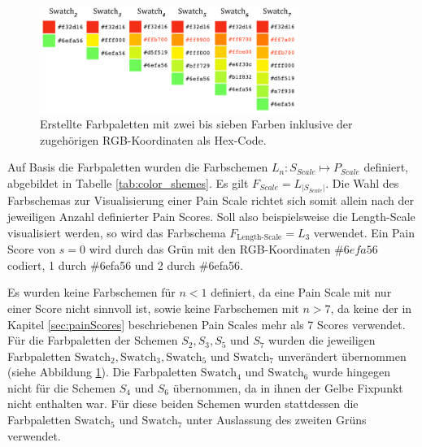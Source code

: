 \begin{figure}[h]
	\centering
	\includegraphics[width=0.75\textwidth]{bilder/colorpics.png}
	\caption{Erstellte Farbpaletten mit zwei bis sieben Farben inklusive der zugehörigen RGB-Koordinaten als Hex-Code.}
	\label{fig:color-swatches}
\end{figure}

Auf Basis die Farbpaletten wurden die Farbschemen $L_{n}: S_{Scale} \mapsto P_{Scale}$ definiert, abgebildet in Tabelle \ref{tab:color_shemes}. Es gilt $F_{Scale} = L_{|S_{Scale}|}$. Die Wahl des Farbschemas zur Visualisierung einer Pain Scale richtet sich somit allein nach der jeweiligen Anzahl definierter Pain Scores. Soll also beispielsweise die \glqq Length-Scale\grqq{} visualisiert werden, so wird das Farbschema $F_{\text{Length-Scale}} = L_3$ verwendet. Ein Pain Score von $s = 0$ wird durch das Grün mit den RGB-Koordinaten $\#6efa56$ codiert, 1 durch \#6efa56 und 2 durch \#6efa56.

Es wurden keine Farbschemen für $n<1$ definiert, da eine Pain Scale mit nur einer Score nicht sinnvoll ist, sowie keine Farbschemen mit $n>7$, da keine der in Kapitel \ref{sec:painScores} beschriebenen Pain Scales mehr als 7 Scores verwendet. Für die Farbpaletten der Schemen $S_2, S_3, S_5$ und $S_7$ wurden die jeweiligen Farbpaletten $\text{Swatch}_2, \text{Swatch}_3,\text{Swatch}_5$ und $\text{Swatch}_7$ unverändert übernommen (siehe Abbildung \ref{fig:color-swatches}). Die Farbpaletten $\text{Swatch}_4$ und $\text{Swatch}_6$ wurde hingegen nicht für die Schemen $S_4$ und $S_6$ übernommen, da in ihnen der Gelbe Fixpunkt nicht enthalten war. Für diese beiden Schemen wurden stattdessen die Farbpaletten $\text{Swatch}_5$ und $\text{Swatch}_7$ unter Auslassung des zweiten Grüns verwendet.

